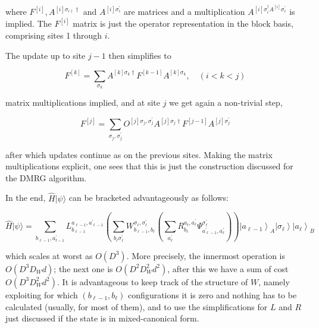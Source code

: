 \documentclass[12pt]{article}
\begin{document}
where $F^{[i]}, A^{[i] \sigma_{i \dagger} \dagger}$ and $A^{[i] \sigma_{i}^{\prime}}$ are matrices and a multiplication $A^{[i] \sigma_{i}^{\dagger} A^{[i]} \sigma_{i}^{\prime}}$ is implied. The $F^{[i]}$ matrix is just the operator representation in the block basis, comprising sites 1 through $i$.

The update up to site $j-1$ then simplifies to


\begin{equation*}
F^{[k]}=\sum_{\sigma_{k}} A^{[k] \sigma_{k} \dagger} F^{[k-1]} A^{[k] \sigma_{k}}, \quad(i<k<j) \tag{199}
\end{equation*}


matrix multiplications implied, and at site $j$ we get again a non-trivial step,


\begin{equation*}
F^{[j]}=\sum_{\sigma_{j}, \sigma_{j}^{\prime}} O^{[j] \sigma_{j}, \sigma_{j}^{\prime}} A^{[j] \sigma_{j} \dagger} F^{[j-1]} A^{[j] \sigma_{j}^{\prime}} \tag{200}
\end{equation*}


after which updates continue as on the previous sites. Making the matrix multiplications explicit, one sees that this is just the construction discussed for the DMRG algorithm.

In the end, $\hat{H}|\psi\rangle$ can be bracketed advantageously as follows:


\begin{equation*}
\hat{H}|\psi\rangle=\sum_{b_{\ell-1}, a_{t-1}^{\prime}} L_{b_{\ell-1}}^{a_{\ell-1}, a_{\ell-1}^{\prime}}\left(\sum_{b_{\ell} \sigma_{\ell}^{\prime}} W_{b_{\ell-1}, b_{\ell}}^{\sigma_{\ell}, \sigma_{\ell}^{\prime}}\left(\sum_{a_{\ell}^{\prime}} R_{b_{\ell}}^{a_{t}, a_{\ell}^{\prime}} \Psi_{a_{\ell-1}^{\prime}, a_{\ell}^{\prime}}^{\sigma_{\ell}^{\prime}}\right)\right)\left|a_{\ell-1}\right\rangle_{A}\left|\sigma_{\ell}\right\rangle\left|a_{\ell}\right\rangle_{B} \tag{201}
\end{equation*}


which scales at worst as $O\left(D^{3}\right)$. More precisely, the innermost operation is $O\left(D^{3} D_{W} d\right)$; the next one is $O\left(D^{2} D_{W}^{2} d^{2}\right)$, after this we have a sum of cost $O\left(D^{3} D_{W}^{2} d^{2}\right)$. It is advantageous to keep track of the structure of $W$, namely exploiting for which $\left(b_{\ell-1}, b_{\ell}\right)$ configurations it is zero and nothing has to be calculated (usually, for most of them), and to use the simplifications for $L$ and $R$ just discussed if the state is in mixed-canonical form.
\end{document}
